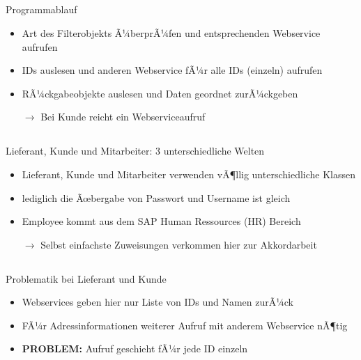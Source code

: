 \documentclass[xcolor={usenames,dvipsnames}, compress, 10pt]{beamer}
\begin{document}
\subsection*{}

\begin{frame}{Programmablauf}
\begin{center}

\begin{itemize}
\item Art des Filterobjekts Ã¼berprÃ¼fen und entsprechenden Webservice aufrufen
\item IDs auslesen und anderen Webservice fÃ¼r alle IDs (einzeln) aufrufen
\item RÃ¼ckgabeobjekte auslesen und Daten geordnet zurÃ¼ckgeben
\item[$\rightarrow$]Bei Kunde reicht ein Webserviceaufruf
\end{itemize}

\end{center}
\end{frame}

\subsection*{}

\begin{frame}{Lieferant, Kunde und Mitarbeiter: 3 unterschiedliche Welten}
\begin{center}

\begin{itemize}
\item Lieferant, Kunde und Mitarbeiter verwenden vÃ¶llig unterschiedliche Klassen
\item lediglich die Ãœbergabe von Passwort und Username ist gleich
\item Employee kommt aus dem SAP Human Ressources (HR) Bereich
\item [$\rightarrow$]Selbst einfachste Zuweisungen verkommen hier zur Akkordarbeit
\end{itemize}

\end{center}
\end{frame}

\subsection*{}

\begin{frame}{Problematik bei Lieferant und Kunde}
\begin{center}

\begin{itemize}
\item Webservices geben hier nur Liste von IDs und Namen zurÃ¼ck
\item FÃ¼r Adressinformationen weiterer Aufruf mit anderem Webservice nÃ¶tig
\item \textbf{PROBLEM: } Aufruf geschieht fÃ¼r jede ID einzeln
\end{itemize}

\end{center}
\end{frame}
\end{document}

